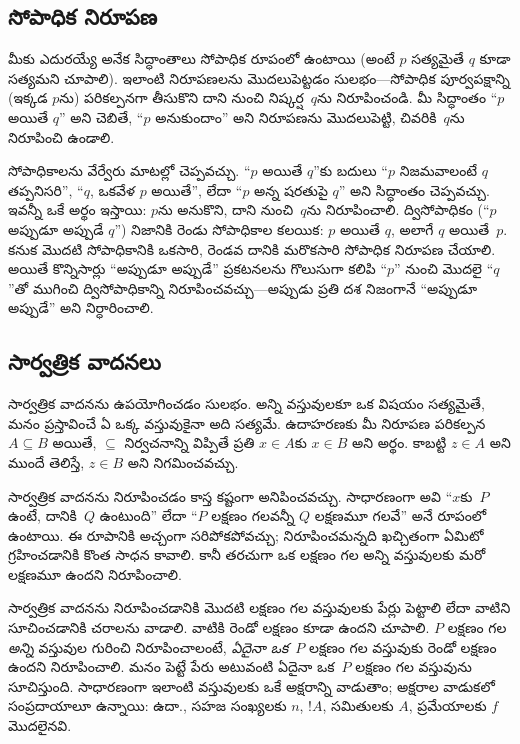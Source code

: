 \documentclass[../../../include/open-logic-section]{subfiles}
\begin{document}
\subsection{సోపాధిక నిరూపణ}

మీకు ఎదురయ్యే అనేక సిద్ధాంతాలు సోపాధిక రూపంలో ఉంటాయి (అంటే $p$ సత్యమైతే $q$ కూడా సత్యమని చూపాలి). ఇలాంటి నిరూపణలను మొదలుపెట్టడం సులభం---సోపాధిక పూర్వపక్షాన్ని (ఇక్కడ $p$ను) పరికల్పనగా తీసుకొని దాని నుంచి నిష్కర్ష~$q$ను నిరూపించండి. మీ సిద్ధాంతం ``$p$ అయితే $q$'' అని చెబితే, ``$p$ అనుకుందాం'' అని నిరూపణను మొదలుపెట్టి, చివరికి~$q$ను నిరూపించి ఉండాలి.

సోపాధికాలను వేర్వేరు మాటల్లో చెప్పవచ్చు. ``$p$ అయితే $q$''కు బదులు ``$p$ నిజమవాలంటే $q$ తప్పనిసరి'', ``$q$, ఒకవేళ $p$ అయితే'', లేదా ``$p$ అన్న షరతుపై $q$'' అని సిద్ధాంతం చెప్పవచ్చు. ఇవన్నీ ఒకే అర్థం ఇస్తాయి: $p$ను అనుకొని, దాని నుంచి~$q$ను నిరూపించాలి. ద్విసోపాధికం (``$p$ అప్పుడూ అప్పుడే $q$'') నిజానికి రెండు సోపాధికాల కలయిక: $p$ అయితే $q$, అలాగే $q$ అయితే~$p$. కనుక మొదటి సోపాధికానికి ఒకసారి, రెండవ దానికి మరొకసారి సోపాధిక నిరూపణ చేయాలి. అయితే కొన్నిసార్లు ``అప్పుడూ అప్పుడే'' ప్రకటనలను గొలుసుగా కలిపి ``$p$'' నుంచి మొదలై ``$q$''తో ముగించి ద్విసోపాధికాన్ని నిరూపించవచ్చు---అప్పుడు ప్రతి దశ నిజంగానే ``అప్పుడూ అప్పుడే'' అని నిర్ధారించాలి.

\subsection{సార్వత్రిక వాదనలు}

సార్వత్రిక వాదనను ఉపయోగించడం సులభం. అన్ని వస్తువులకూ ఒక విషయం సత్యమైతే, మనం ప్రస్తావించే ఏ ఒక్క వస్తువుకైనా అది సత్యమే. ఉదాహరణకు మీ నిరూపణ పరికల్పన $A \subseteq B$ అయితే, $\subseteq$ నిర్వచనాన్ని విప్పితే ప్రతి $x \in A$కు $x \in B$ అని అర్థం. కాబట్టి $z \in A$ అని ముందే తెలిస్తే, $z \in B$ అని నిగమించవచ్చు.

సార్వత్రిక వాదనను నిరూపించడం కాస్త కష్టంగా అనిపించవచ్చు. సాధారణంగా అవి ``$x$కు~$P$ ఉంటే, దానికి~$Q$ ఉంటుంది'' లేదా ``$P$ లక్షణం గలవన్నీ $Q$ లక్షణమూ గలవే'' అనే రూపంలో ఉంటాయి. ఈ రూపానికి అచ్చంగా సరిపోకపోవచ్చు; నిరూపించమన్నది ఖచ్చితంగా ఏమిటో గ్రహించడానికి కొంత సాధన కావాలి. కానీ తరచుగా ఒక లక్షణం గల అన్ని వస్తువులకు మరో లక్షణమూ ఉందని నిరూపించాలి.

సార్వత్రిక వాదనను నిరూపించడానికి మొదటి లక్షణం గల వస్తువులకు పేర్లు పెట్టాలి లేదా వాటిని సూచించడానికి చరాలను వాడాలి. వాటికి రెండో లక్షణం కూడా ఉందని చూపాలి. $P$ లక్షణం గల \emph{అన్ని} వస్తువుల గురించి నిరూపించాలంటే, \emph{ఏదైనా ఒక}~$P$ లక్షణం గల
వస్తువుకు రెండో లక్షణం ఉందని నిరూపించాలి. మనం పెట్టే పేరు
అటువంటి ఏదైనా ఒక~$P$ లక్షణం గల వస్తువును సూచిస్తుంది. సాధారణంగా ఇలాంటి వస్తువులకు ఒకే అక్షరాన్ని వాడుతాం; అక్షరాల వాడుకలో సంప్రదాయాలూ ఉన్నాయి: ఉదా., సహజ సంఖ్యలకు $n$,  $!A$, సమితులకు $A$, ప్రమేయాలకు $f$ మొదలైనవి.
\end{document}
